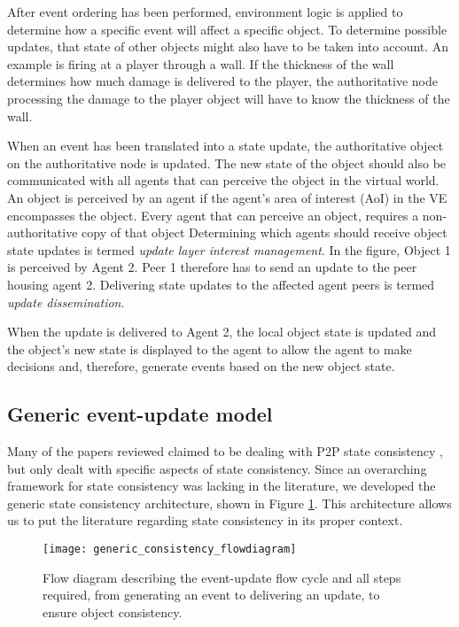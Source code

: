After event ordering has been performed, environment logic is applied to determine how a specific event will affect a specific object. To determine possible updates, that state of other objects might also have to be taken into account. An example is firing at a player through a wall. If the thickness of the wall determines how much damage is delivered to the player, the authoritative node processing the damage to the player object will have to know the thickness of the wall.

When an event has been translated into a state update, the authoritative object on the authoritative node is updated. The new state of the object should also be communicated with all agents that can perceive the object in the virtual world. An object is perceived by an agent if the agent's area of interest (AoI)  in the VE encompasses the object. Every agent that can perceive an object, requires a non-authoritative copy of that object Determining which agents should receive object state updates is termed \emph{update layer interest management}. In the figure, Object 1 is perceived by Agent 2. Peer 1 therefore has to send an update to the peer housing agent 2. Delivering state updates to the affected agent peers is termed \emph{update dissemination}.

When the update is delivered to Agent 2, the local object state is updated and the object's new state is displayed to the agent to allow the agent to make decisions and, therefore, generate events based on the new object state.

\subsection{Generic event-update model}
\label{generic_event_update_model}

Many of the papers reviewed claimed to be dealing with P2P state consistency \cite{}, but only dealt with specific aspects of state consistency. Since an overarching framework for state consistency was lacking in the literature, we developed the generic state consistency architecture, shown in Figure \ref{fig_event_update_flowdiagram}. This architecture allows us to put the literature regarding state consistency in its proper context.

\begin{figure}[htbp]
 \centering
 \texttt{[image: generic\_consistency\_flowdiagram]}
 \caption{Flow diagram describing the event-update flow cycle and all steps required, from generating an event to delivering an update, to ensure object consistency.}
 \label{fig_event_update_flowdiagram}
\end{figure}

